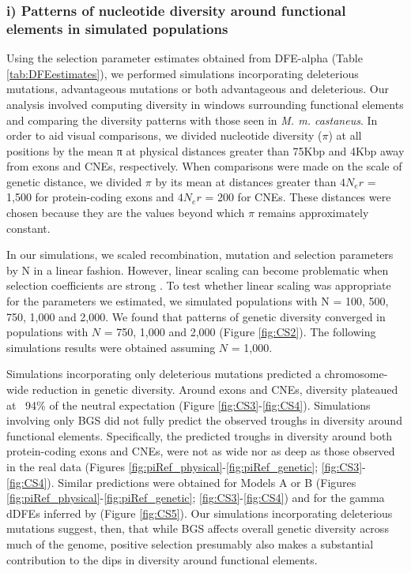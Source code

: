 \subsubsection{i) Patterns of nucleotide diversity around functional elements in simulated populations}

	Using the selection parameter estimates obtained from DFE-alpha (Table \ref{tab:DFEestimates}), we performed simulations incorporating deleterious mutations, advantageous mutations or both advantageous and deleterious. Our analysis involved computing diversity in windows surrounding functional elements and comparing the diversity patterns with those seen in \textit{M. m. castaneus}. In order to aid visual comparisons, we divided nucleotide diversity ($\pi$) at all positions by the mean π at physical distances greater than 75Kbp and 4Kbp away from exons and CNEs, respectively. When comparisons were made on the scale of genetic distance, we divided $\pi$ by its mean at distances greater than $4N_er$ = 1,500 for protein-coding exons and $4N_er$ = 200 for CNEs. These distances were chosen because they are the values beyond which $\pi$ remains approximately constant. 

	In our simulations, we scaled recombination, mutation and selection parameters by N in a linear fashion. However, linear scaling can become problematic when selection coefficients are strong \citep{RN198}. To test whether linear scaling was appropriate for the parameters we estimated, we simulated populations with N = 100, 500, 750, 1,000 and 2,000. We found that patterns of genetic diversity converged in populations with $N$ = 750, 1,000 and 2,000 (Figure \ref{fig:CS2}). The following simulations results were obtained assuming $N$ = 1,000. 


	Simulations incorporating only deleterious mutations predicted a chromosome-wide reduction in genetic diversity. Around exons and CNEs, diversity plateaued at ~94\% of the neutral expectation (Figure \ref{fig:CS3}-\ref{fig:CS4}). Simulations involving only BGS did not fully predict the observed troughs in diversity around functional elements. Specifically, the predicted troughs in diversity around both protein-coding exons and CNEs, were not as wide nor as deep as those observed in the real data (Figures \ref{fig:piRef_physical}-\ref{fig:piRef_genetic}; \ref{fig:CS3}-\ref{fig:CS4}). Similar predictions were obtained for Models A or B (Figures \ref{fig:piRef_physical}-\ref{fig:piRef_genetic}; \ref{fig:CS3}-\ref{fig:CS4}) and for the gamma dDFEs inferred by \cite{RN122} (Figure \ref{fig:CS5}). Our simulations incorporating deleterious mutations suggest, then, that while BGS affects overall genetic diversity across much of the genome, positive selection presumably also makes a substantial contribution to the dips in diversity around functional elements.
	

